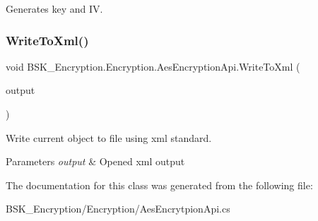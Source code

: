 Generates key and IV. 

\mbox{\label{class_b_s_k___encryption_1_1_encryption_1_1_aes_encryption_api_a8849055915f670369e4c835bc4b71414}} 
\subsubsection{\texorpdfstring{Write\+To\+Xml()}{WriteToXml()}}
{\footnotesize\ttfamily void B\+S\+K\+\_\+\+Encryption.\+Encryption.\+Aes\+Encryption\+Api.\+Write\+To\+Xml (\begin{DoxyParamCaption}\item[{Xml\+Writer}]{output }\end{DoxyParamCaption})}



Write current object to file using xml standard. 


\begin{DoxyParams}{Parameters}
{\em output} & Opened xml output\\
\hline
\end{DoxyParams}


The documentation for this class was generated from the following file\+:\begin{DoxyCompactItemize}
\item 
B\+S\+K\+\_\+\+Encryption/\+Encryption/Aes\+Encrytpion\+Api.\+cs\end{DoxyCompactItemize}
